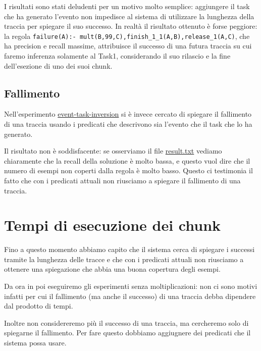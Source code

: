I risultati sono stati deludenti per un motivo molto semplice: aggiungere il task che ha generato l'evento non impedisce al sistema di utilizzare la lunghezza della traccia per spiegare il suo successo. In realtà il risultato ottenuto è forse peggiore: la regola \texttt{failure(A):- mult(B,99,C),finish\_1\_1(A,B),release\_1(A,C)}, che ha precision e recall massime, attribuisce il successo di una futura traccia su cui faremo inferenza solamente al Task1, considerando il suo rilascio e la fine dell'esezione di uno dei suoi chunk.

\subsection{Fallimento}
Nell'esperimento \href{https://github.com/edoardosarri24/prediction-in-data-driven-system/7-event-task-inversion/}{event-task-inversion} si è invece cercato di spiegare il fallimento di una traccia usando i predicati che descrivono sia l'evento che il task che lo ha generato.

Il risultato non è soddisfacente: se osserviamo il file \href{https://github.com/edoardosarri24/prediction-in-data-driven-system/7-event-task-chunk-inversion/result.txt}{result.txt} vediamo chiaramente che la recall della soluzione è molto bassa, e questo vuol dire che il numero di esempi non coperti dalla regola è molto basso. Questo ci testimonia il fatto che con i predicati attuali non riusciamo a spiegare il fallimento di una traccia.

\section{Tempi di esecuzione dei chunk}
Fino a questo momento abbiamo capito che il sistema cerca di spiegare i successi tramite la lunghezza delle tracce e che con i predicati attuali non riusciamo a ottenere una spiegazione che abbia una buona copertura degli esempi.

Da ora in poi eseguiremo gli esperimenti senza moltiplicazioni: non ci sono motivi infatti per cui il fallimento (ma anche il successo) di una traccia debba dipendere dal prodotto di tempi.

Inoltre non considereremo più il successo di una traccia, ma cercheremo solo di spiegarne il fallimento. Per fare questo dobbiamo aggiugnere dei predicati che il sistema possa usare.


